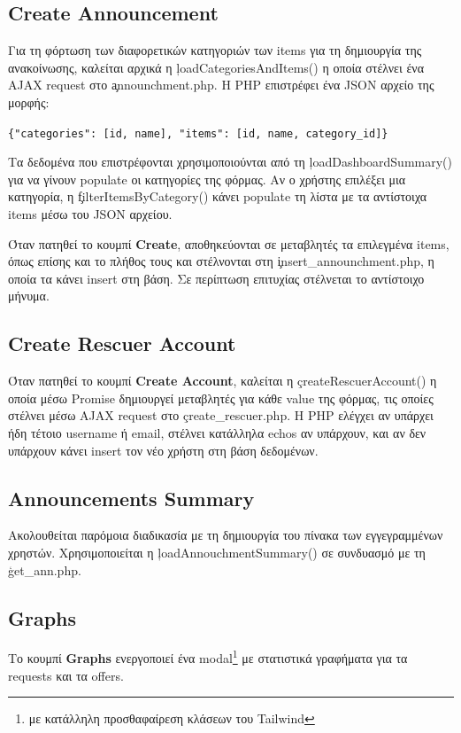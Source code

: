     \subsection{Create Announcement}
        Για τη φόρτωση των διαφορετικών κατηγοριών των items για τη δημιουργία της ανακοίνωσης, καλείται αρχικά η \c{loadCategoriesAndItems()}
        η οποία στέλνει ένα AJAX request στο \c{announchment.php}.
        Η PHP επιστρέφει ένα JSON αρχείο της μορφής:

        \begin{graycomment}
            \verb|{"categories": [id, name], "items": [id, name, category_id]}|
        \end{graycomment}

        Τα δεδομένα που επιστρέφονται χρησιμοποιούνται από τη \c{loadDashboardSummary()} για να γίνουν populate οι κατηγορίες της φόρμας.
        Αν ο χρήστης επιλέξει μια κατηγορία, η \c{filterItemsByCategory()} κάνει populate τη λίστα με τα αντίστοιχα items μέσω του JSON αρχείου.

        Όταν πατηθεί το κουμπί \textbf{Create}, αποθηκεύονται σε μεταβλητές τα επιλεγμένα items, όπως επίσης και το πλήθος τους
        και στέλνονται στη \c{insert\_announchment.php}, η οποία τα κάνει insert στη βάση.
        Σε περίπτωση επιτυχίας στέλνεται το αντίστοιχο μήνυμα.

    \subsection{Create Rescuer Account}
        Όταν πατηθεί το κουμπί \textbf{Create Account}, καλείται η \c{createRescuerAccount()} η οποία μέσω Promise δημιουργεί μεταβλητές για κάθε value της φόρμας,
            τις οποίες στέλνει μέσω AJAX request στο \c{create\_rescuer.php}.
        Η PHP ελέγχει αν υπάρχει ήδη τέτοιο username ή email, στέλνει κατάλληλα echos αν υπάρχουν, και αν δεν υπάρχουν κάνει insert τον νέο χρήστη στη βάση δεδομένων.

    \subsection{Announcements Summary}
        Ακολουθείται παρόμοια διαδικασία με τη δημιουργία του πίνακα των εγγεγραμμένων χρηστών.
        Χρησιμοποιείται η \c{loadAnnouchmentSummary()} σε συνδυασμό με τη \c{get\_ann.php}.

    \subsection{Graphs}
        Το κουμπί \textbf{Graphs} ενεργοποιεί ένα modal\footnote{με κατάλληλη προσθαφαίρεση κλάσεων του Tailwind} με στατιστικά γραφήματα για τα requests και τα offers.

